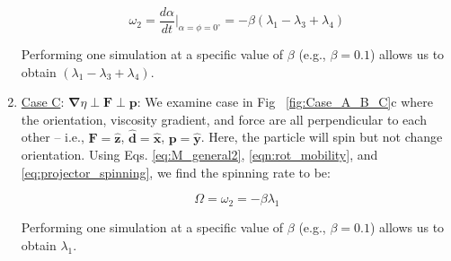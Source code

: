 \documentclass{jfm}
\begin{document}
\begin{enumerate}
\begin{equation}
    \omega_2 = \frac{d \alpha}{d t}|_{\alpha = \phi = 0^{\circ}} = -\beta (\lambda_1 - \lambda_3 + \lambda_4)
\end{equation}

 Performing one simulation at a specific value of $\beta$ (e.g.,  $\beta=0.1$) allows us to obtain $(\lambda_1-\lambda_3+\lambda_4)$. \\

 \item \underline{Case C}: $\boldsymbol{\nabla} \eta \perp \boldsymbol{F} \perp \boldsymbol{p}$: 
 We examine case in Fig ~\ref{fig:Case_A_B_C}c where the orientation, viscosity gradient, and force are all perpendicular to each other – i.e., $\boldsymbol{F}=\boldsymbol{\hat{z}}$, $\boldsymbol{\hat{d }} = \boldsymbol{\hat{x}}$, $\boldsymbol{p}= \boldsymbol{\hat{y}}$.  Here, the particle will spin but not change orientation.  Using Eqs. \eqref{eq:M_general2}, \eqref{eqn:rot_mobility}, and \eqref{eq:projector_spinning}, we find the spinning rate to be:  

 \begin{equation}
\label{eq:evolution_equation_caseC_final}
    \Omega = \omega_2 =-\beta \lambda_1
\end{equation}

Performing one simulation at a specific value of $\beta$ (e.g.,  $\beta=0.1$) allows us to obtain $\lambda_1$.\\
\end{enumerate}



\end{document}
